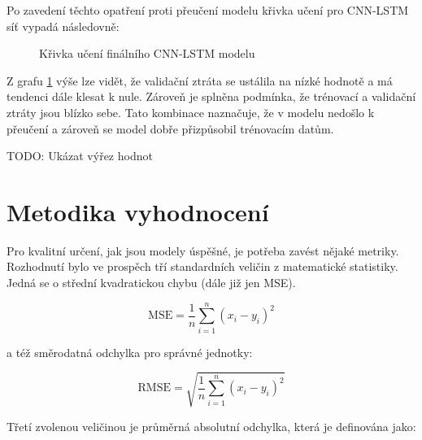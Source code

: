 \documentclass[FM,BP,fonts]{tulthesis}
\begin{document}
Po zavedení těchto opatření proti přeučení modelu křivka učení pro CNN-LSTM síť vypadá následovně:

\begin{figure}[htbp]
	\centering
	\caption{Křivka učení finálního CNN-LSTM modelu}
	\label{fig:cnn_lstm_learning_curve}
\end{figure}

Z grafu \ref{fig:cnn_lstm_learning_curve} výše lze vidět, že validační ztráta se ustálila na nízké hodnotě a má tendenci dále klesat k nule. Zároveň je splněna podmínka, že  trénovací a validační ztráty jsou blízko sebe. Tato kombinace naznačuje, že v modelu nedošlo k přeučení a zároveň se model dobře přizpůsobil trénovacím datům.

TODO: Ukázat výřez hodnot

\newpage
\section{Metodika vyhodnocení}\label{section:error-matrix}
Pro kvalitní určení, jak jsou modely úspěšné, je potřeba zavést nějaké metriky. Rozhodnutí bylo ve prospěch tří standardních veličin z matematické statistiky. Jedná se o střední kvadratickou chybu (dále již jen MSE). 

\begin{equation}
	\text{MSE} = \frac{1}{n}\sum_{i=1}^{n}(x_i-y_i)^2 
\end{equation}

a též směrodatná odchylka pro správné jednotky:

\begin{equation}
	\text{RMSE} = \sqrt{\frac{1}{n}\sum_{i=1}^{n}(x_i-y_i)^2}
\end{equation}

Třetí zvolenou veličinou je průměrná absolutní odchylka, která je definována jako:
\end{document}
